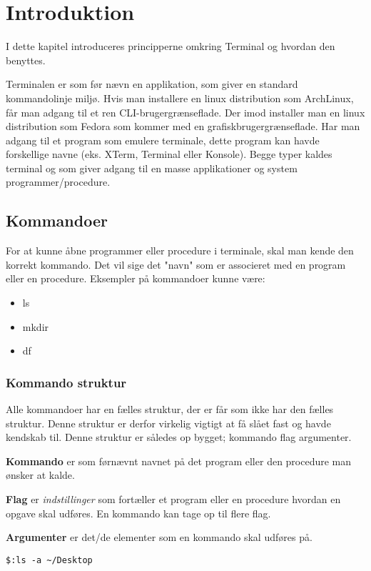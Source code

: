 \chapter{Introduktion}
I dette kapitel introduceres principperne omkring Terminal og hvordan den benyttes. \par
Terminalen er som før nævn en applikation, som giver en standard kommandolinje miljø. Hvis man installere en linux distribution som ArchLinux, får man adgang til et ren CLI-brugergrænseflade. Der imod installer man en linux distribution som Fedora som kommer med en grafiskbrugergrænseflade. Har man adgang til et program som emulere terminale, dette
program kan havde forskellige navne (eks. XTerm, Terminal eller Konsole). Begge typer kaldes terminal og som giver adgang til en masse applikationer og system programmer/procedure.
\section{Kommandoer}
For at kunne åbne programmer eller procedure i terminale, skal man kende den korrekt kommando. Det vil sige det "navn" som er associeret med en program eller en procedure. 
Eksempler på kommandoer kunne være:
\begin{itemize}
	\item ls
	\item mkdir
	\item df
\end{itemize}
\subsection*{Kommando struktur}
Alle kommandoer har en fælles struktur, der er får som ikke har den fælles struktur.
Denne struktur er derfor virkelig vigtigt at få slået fast og havde kendskab til. Denne struktur er således op bygget; kommando flag argumenter.\par
\textbf{Kommando} er som førnævnt navnet på det program eller den procedure man ønsker at kalde. \par
\textbf{Flag} er \textit{indstillinger} som fortæller et program eller en procedure hvordan en opgave skal udføres. En kommando kan tage op til flere flag.\par
\textbf{Argumenter} er det/de elementer som en kommando skal udføres på.
\begin{lstlisting}[title=kommando eksempel]
	$:ls -a ~/Desktop 
\end{lstlisting}
